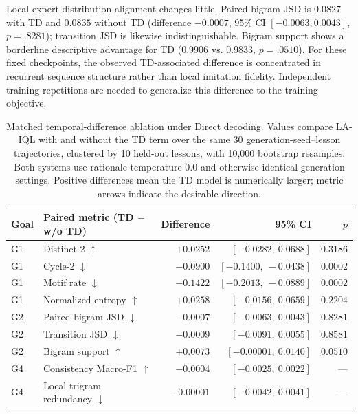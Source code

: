 \documentclass[manuscript,review,anonymous]{acmart}
\begin{document}
Local expert-distribution alignment changes little. Paired bigram JSD is
$0.0827$ with TD and $0.0835$ without TD (difference $-0.0007$, 95\% CI
$[-0.0063,0.0043]$, $p=.8281$); transition JSD is likewise
indistinguishable. Bigram support shows a borderline descriptive advantage for
TD ($0.9906$ vs. $0.9833$, $p=.0510$). For these fixed checkpoints, the
observed TD-associated difference is concentrated in recurrent sequence
structure rather than local imitation fidelity. Independent training
repetitions are needed to generalize this difference to the training objective.

\begin{table}[t]
\centering
\small
\setlength{\tabcolsep}{4pt}
\begin{tabular}{llrrr}
\toprule
Goal & Paired metric (TD $-$ w/o TD) & Difference & 95\% CI & $p$ \\
\midrule
G1 & Distinct-2 $\uparrow$ & $+0.0252$ & $[-0.0282,\ 0.0688]$ & $0.3186$ \\
G1 & Cycle-2 $\downarrow$ & $-0.0900$ & $[-0.1400,\ -0.0438]$ & $0.0002$ \\
G1 & Motif rate $\downarrow$ & $-0.1422$ & $[-0.2013,\ -0.0889]$ & $0.0002$ \\
G1 & Normalized entropy $\uparrow$ & $+0.0258$ & $[-0.0156,\ 0.0659]$ & $0.2204$ \\
G2 & Paired bigram JSD $\downarrow$ & $-0.0007$ & $[-0.0063,\ 0.0043]$ & $0.8281$ \\
G2 & Transition JSD $\downarrow$ & $-0.0009$ & $[-0.0091,\ 0.0055]$ & $0.8581$ \\
G2 & Bigram support $\uparrow$ & $+0.0073$ & $[-0.00001,\ 0.0140]$ & $0.0510$ \\
G4 & Consistency Macro-F1 $\uparrow$ & $-0.0004$ & $[-0.0025,\ 0.0022]$ & --- \\
G4 & Local trigram redundancy $\downarrow$ & $-0.00001$ & $[-0.0042,\ 0.0041]$ & --- \\
\bottomrule
\end{tabular}
\caption{Matched temporal-difference ablation under Direct decoding. Values
compare LA-IQL with and without the TD term over the same 30 generation-seed--lesson
trajectories, clustered by 10 held-out lessons, with 10,000 bootstrap
resamples. Both systems use rationale temperature 0.0 and otherwise identical
generation settings. Positive differences mean the TD model is numerically
larger; metric arrows indicate the desirable direction.}
\label{tab:td-ablation-paired}
\end{table}
 
\end{document}
